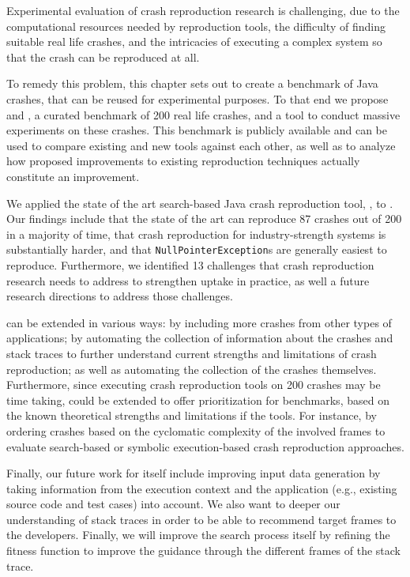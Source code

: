 Experimental evaluation of crash reproduction research is challenging, due to the computational resources needed by reproduction tools, the difficulty of finding suitable real life crashes, and the intricacies of executing a complex system so that the crash can be reproduced at all.

To remedy this problem, this chapter sets out to create a benchmark of Java crashes, that can be reused for experimental purposes.
To that end we propose \crashpack and \exrunner, a curated benchmark of 200 real life crashes, and a tool to conduct massive experiments on these crashes.
This benchmark is publicly available and can be used to compare existing and new tools against each other, as well as to analyze how proposed improvements to existing reproduction techniques actually constitute an improvement.

We applied the state of the art search-based Java crash reproduction tool, \evocrash, to \crashpack. Our findings include that the state of the art can reproduce 87 crashes out of 200 in a majority of time, that crash reproduction for industry-strength systems is substantially harder, and that \texttt{NullPointerException}s are generally easiest to reproduce. Furthermore, we identified 13 challenges that crash reproduction research needs to address to strengthen uptake in practice, as well a future research directions to address those challenges.

\crashpack  can be extended in various ways: by including more crashes from other types of applications; by automating the collection of information about the crashes and stack traces to further understand current strengths and limitations of crash reproduction; as well as automating the collection of the crashes themselves. Furthermore, since executing crash reproduction tools on 200 crashes may be time taking, \crashpack could be extended to offer prioritization for benchmarks, based on the known theoretical strengths and limitations if the tools. For instance, by ordering crashes based on the cyclomatic complexity of the involved frames to evaluate search-based or symbolic execution-based crash reproduction approaches. 

Finally, our future work for \evocrash itself include improving input data generation by taking information from the execution context and the application (e.g., existing source code and test cases) into account. We also want to deeper our understanding of stack traces in order to be able to recommend target frames to the developers. Finally, we will improve the search process itself by refining the fitness function to improve the guidance through the different frames of the stack trace.

